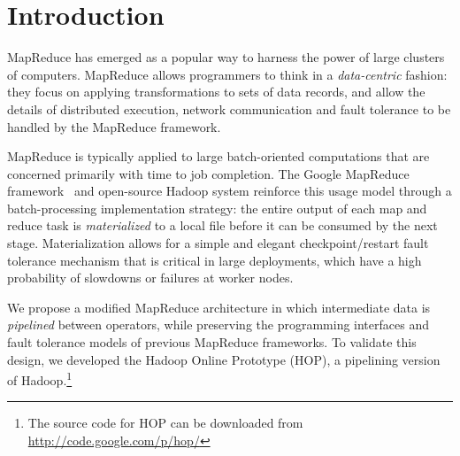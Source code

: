 \section{Introduction}
\label{sec:intro}
MapReduce has emerged as a popular way to harness the power of large clusters of
computers. MapReduce allows programmers to think in a \emph{data-centric}
fashion: they focus on applying transformations to sets of data records, and
allow the details of distributed execution, network communication and fault
tolerance to be handled by the MapReduce framework.

MapReduce is typically applied to large batch-oriented computations that are
concerned primarily with time to job completion.  The Google MapReduce
framework~\cite{mapreduce-osdi} and open-source Hadoop system reinforce this
usage model through a batch-processing implementation strategy: the entire
output of each map and reduce task is \emph{materialized} to a local file
before it can be consumed by the next stage.  Materialization allows for a
simple and elegant checkpoint/restart fault tolerance mechanism that is critical
in large deployments, which have a high probability of slowdowns or failures at
worker nodes.

We propose a modified MapReduce architecture in which intermediate data is
\emph{pipelined} between operators, while preserving the programming interfaces
and fault tolerance models of previous MapReduce frameworks. To validate this
design, we developed the Hadoop Online Prototype (HOP), a pipelining version of
Hadoop.\footnote{The source code for HOP can be downloaded from \url{http://code.google.com/p/hop/}}

